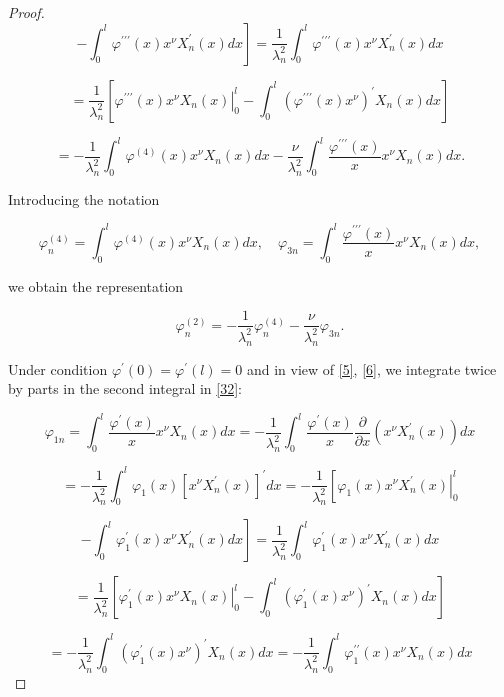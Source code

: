 \documentclass[reqno]{amsart}
\theoremstyle{definition}
\numberwithin{equation}{section}
\begin{document}
\begin{proof}
$$ \left.-\int_0^l \varphi^{\prime \prime \prime}(x) x^\nu X_n^{\prime}(x) d x\right]=\frac{1}{\lambda_n^2} \int_0^l \varphi^{\prime \prime \prime}(x) x^\nu X_n^{\prime}(x) d x $$

$$ = \frac{1}{\lambda_n^2}\left[\left.\varphi^{\prime \prime \prime}(x) x^\nu X_n(x)\right|_0 ^l-\int_0^l\left(\varphi^{\prime \prime \prime}(x) x^\nu\right)^{\prime} X_n(x) d x\right]$$

$$ =  -\frac{1}{\lambda_n^2} \int_0^l \varphi^{(4)}(x) x^\nu X_n(x) d x-\frac{\nu}{\lambda_n^2} \int_0^l \frac{\varphi^{\prime \prime \prime}(x)}{x} x^\nu X_n(x) d x.$$



Introducing the notation

$$
\varphi_n^{(4)}=\int_0^l \varphi^{(4)}(x) x^\nu X_n(x) d x, \quad \varphi_{3 n}=\int_0^l \frac{\varphi^{\prime \prime \prime}(x)}{x} x^\nu X_n(x) d x,
$$

we obtain the representation

\begin{equation}\label{34}
    \varphi_n^{(2)}=-\frac{1}{\lambda_n^2} \varphi_n^{(4)}-\frac{\nu}{\lambda_n^2} \varphi_{3 n}.
\end{equation}

                   
Under condition $\varphi^{\prime}(0)=\varphi^{\prime}(l)=0$ and in view of \eqref{5}, \eqref{6}, we integrate twice by parts in the second integral in \eqref{32}:

$$ \varphi_{1 n}=  \int_0^l \frac{\varphi^{\prime}(x)}{x} x^\nu X_n(x) d x=-\frac{1}{\lambda_n^2} \int_0^l \frac{\varphi^{\prime}(x)}{x}\frac{\partial}{\partial x}\left(x^\nu X_n^{\prime}(x)\right) d x$$

$$ = -\frac{1}{\lambda_n^2} \int_0^l \varphi_1(x)\left[x^\nu X_n^{\prime}(x)\right]^{\prime} d x=-\frac{1}{\lambda_n^2}\left[\left.\varphi_1(x) x^\nu X_n^{\prime}(x)\right|_0 ^l\right.$$

$$ \left.-\int_0^l \varphi_1^{\prime}(x) x^\nu  X_n^{\prime}(x) d x\right]=\frac{1}{\lambda_n^2} \int_0^l \varphi_1^{\prime}(x) x^\nu X_n^{\prime}(x) d x$$

$$=  \frac{1}{\lambda_n^2}\left[\left.\varphi_1^{\prime}(x) x^\nu X_n(x)\right|_0 ^l-\int_0^l\left(\varphi_1^{\prime}(x) x^\nu \right)^{\prime} X_n(x) d x\right]$$

$$=  -\frac{1}{\lambda_n^2} \int_0^l\left(\varphi_1^{\prime}(x) x^\nu \right)^{\prime} X_n(x) d x=-\frac{1}{\lambda_n^2} \int_0^l \varphi_1^{\prime \prime}(x) x^\nu X_n(x) d x $$



\end{proof}
\end{document}
